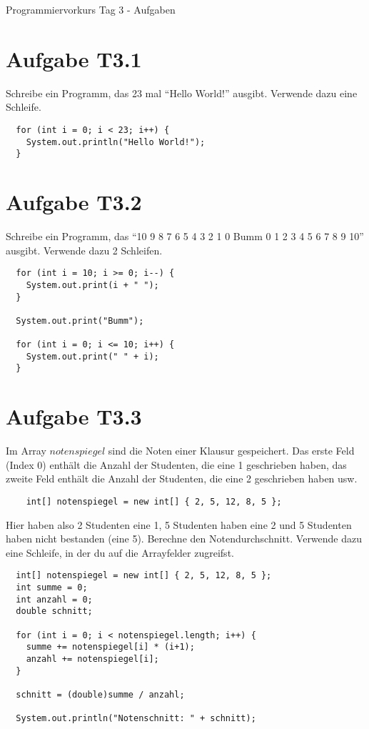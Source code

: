 \documentclass[final,a4paper]{article}
\begin{document}


{\huge Programmiervorkurs Tag 3 - Aufgaben}

\bigskip

\section*{Aufgabe T3.1}
	Schreibe ein Programm, das 23 mal "`Hello World!"' ausgibt. Verwende dazu eine Schleife.

	\begin{lstlisting}
  for (int i = 0; i < 23; i++) {
	System.out.println("Hello World!");
  }
	\end{lstlisting}

\section*{Aufgabe T3.2}
	Schreibe ein Programm, das "`10 9 8 7 6 5 4 3 2 1 0 Bumm 0 1 2 3 4 5 6 7 8 9 10"' ausgibt.
	Verwende dazu 2 Schleifen.

	\begin{lstlisting}
  for (int i = 10; i >= 0; i--) {
	System.out.print(i + " ");
  }

  System.out.print("Bumm");

  for (int i = 0; i <= 10; i++) {
	System.out.print(" " + i);
  }
	\end{lstlisting}

\section*{Aufgabe T3.3}
	Im Array $notenspiegel$ sind die Noten einer Klausur gespeichert. Das erste Feld (Index $0$)
	enthält die Anzahl der Studenten, die eine 1 geschrieben haben, das zweite Feld enthält
	die Anzahl der Studenten, die eine 2 geschrieben haben usw.
	\begin{lstlisting}
	int[] notenspiegel = new int[] { 2, 5, 12, 8, 5 };
	\end{lstlisting}
	Hier haben also 2 Studenten eine 1, 5 Studenten haben eine 2 und 5 Studenten haben nicht bestanden (eine 5).
	Berechne den Notendurchschnitt. Verwende dazu eine Schleife, in der du auf die
	Arrayfelder zugreifst.

	\begin{lstlisting}
  int[] notenspiegel = new int[] { 2, 5, 12, 8, 5 };
  int summe = 0;
  int anzahl = 0;
  double schnitt;

  for (int i = 0; i < notenspiegel.length; i++) {
	summe += notenspiegel[i] * (i+1);
	anzahl += notenspiegel[i];
  }

  schnitt = (double)summe / anzahl;

  System.out.println("Notenschnitt: " + schnitt);
	\end{lstlisting}
\end{document}
